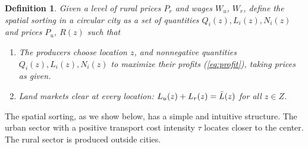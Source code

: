 \documentclass[12pt]{article}
\newtheorem{definition}{Definition}
\begin{document}
\begin{definition}
Given a level of rural prices $P_r$ and wages $W_u$, $W_r$, define the \emph{spatial sorting} in a circular city as a set of quantities $Q_i(z), L_i(z), N_i(z)$ and prices $P_u$, $R(z)$ such that
\begin{enumerate}
    \item The producers choose location $z$, and nonnegative quantities $Q_i(z), L_i(z), N_i(z)$ to maximize their profits (\ref{eq:profit}), taking prices as given.
    \item Land markets clear at every location: $L_u(z)+L_r(z)=\Bar L(z)$ for all $z\in Z$.
\end{enumerate}
\end{definition}
The spatial sorting, as we show below, has a simple and intuitive structure. The urban sector with a positive transport cost intensity $\tau$ locates closer to the center. The rural sector is produced outside cities.
\end{document}
